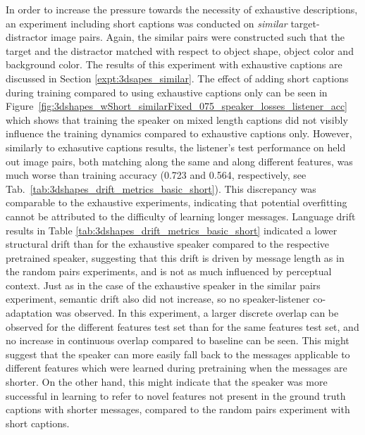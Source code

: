 In order to increase the pressure towards the necessity of exhaustive descriptions, an experiment including short captions was conducted on \emph{similar} target-distractor image pairs. Again, the similar pairs were constructed such that the target and the distractor matched with respect to object shape, object color and background color. The results of this experiment with exhaustive captions are discussed in Section \ref{expt:3dsapes_similar}. The effect of adding short captions during training compared to using exhaustive captions only can be seen in Figure~\ref{fig:3dshapes_wShort_similarFixed_075_speaker_losses_listener_acc} which shows that training the speaker on mixed length captions did not visibly influence the training dynamics compared to exhaustive captions only. However, similarly to exhasutive captions results, the listener's test performance on held out image pairs, both matching along the same and along different features, was much worse than training accuracy (0.723 and 0.564, respectively, see Tab.~\ref{tab:3dshapes_drift_metrics_basic_short}). This discrepancy was comparable to the exhaustive experiments, indicating that potential overfitting cannot be attributed to the difficulty of learning longer messages. Language drift results in Table \ref{tab:3dshapes_drift_metrics_basic_short} indicated a lower structural drift than for the exhaustive speaker compared to the respective pretrained speaker, suggesting that this drift is driven by message length as in the random pairs experiments, and is not as much influenced by perceptual context. Just as in the case of the exhaustive speaker in the similar pairs experiment, semantic drift also did not increase, so no speaker-listener co-adaptation was observed. In this experiment, a larger discrete overlap can be observed for the different features test set than for the same features test set, and no increase in continuous overlap compared to baseline can be seen. This might suggest that the speaker can more easily fall back to the messages applicable to different features which were learned during pretraining when the messages are shorter. On the other hand, this might indicate that the speaker was more successful in learning to refer to novel features not present in the ground truth captions with shorter messages, compared to the random pairs experiment with short captions.
